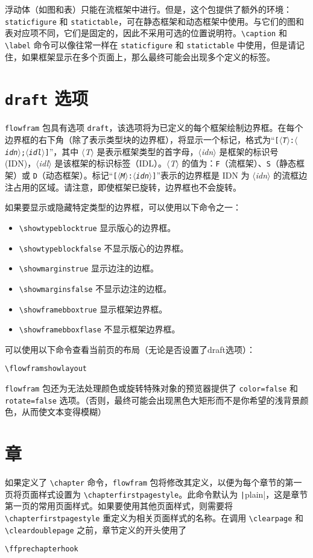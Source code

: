 \documentclass[a4paper]{book}%
\newcommand{\sty}[1]{\texttt{#1}}
\newcommand{\meta}[1]{\textnormal{\ensuremath{\langle}\makebox[0pt][l]{}\emph{#1}\makebox[0pt][l]{}\ensuremath{\rangle}}}
\newcommand{\cmd}[1]{\texttt{#1}}
\begin{document}
浮动体（如图和表）只能在流框架中进行。但是，这个包提供了额外的环境：\cmd{staticfigure} 和 \cmd{statictable}，可在静态框架和动态框架中使用。与它们的图和表对应项不同，它们是固定的，因此不采用可选的位置说明符。\verb|\caption| 和 \verb|\label| 命令可以像往常一样在 \cmd{staticfigure} 和 \cmd{statictable} 中使用，但是请记住，如果框架显示在多个页面上，那么最终可能会出现多个定义的标签。
\section{\cmd{draft} 选项}\label{sec-1-3}%
\sty{flowfram} 包具有选项 \cmd{draft}，该选项将为已定义的每个框架绘制边界框。在每个边界框的右下角（除了表示类型块的边界框），将显示一个标记，格式为“\cmd{[\meta{T}:\meta{idn};\meta{idl}]}”，其中 \meta{T} 是表示框架类型的首字母，\meta{idn} 是框架的标识号(IDN)，\meta{idl} 是该框架的标识标签（IDL）。\meta{T} 的值为：\cmd{F}（流框架）、\cmd{S}（静态框架）或 \cmd{D}（动态框架）。标记“\cmd{[\meta{M}:\meta{idn}]}”表示的边界框是 IDN 为 \meta{idn} 的流框边注占用的区域。请注意，即使框架已旋转，边界框也不会旋转。

如果要显示或隐藏特定类型的边界框，可以使用以下命令之一：
\begin{itemize}
    \item \verb|\showtypeblocktrue| 显示版心的边界框。
    \item \verb|\showtypeblockfalse| 不显示版心的边界框。
    \item \verb|\showmarginstrue| 显示边注的边框。
    \item \verb|\showmarginsfalse| 不显示边注的边框。
    \item \verb|\showframebboxtrue| 显示框架边界框。
    \item \verb|\showframebboxflase| 不显示框架边界框。
\end{itemize}

可以使用以下命令查看当前页的布局（无论是否设置了draft选项）：
\begin{mdframed}
\verb|\flowframshowlayout|
\end{mdframed}

\sty{flowfram} 包还为无法处理颜色或旋转特殊对象的预览器提供了 \cmd{color=false} 和 \cmd{rotate=false} 选项。（否则，最终可能会出现黑色大矩形而不是你希望的浅背景颜色，从而使文本变得模糊）
\section{章}%
如果定义了 \verb|\chapter| 命令，\sty{flowfram} 包将修改其定义，以便为每个章节的第一页将页面样式设置为 \verb|\chapterfirstpagestyle|。此命令默认为 \cmd|plain|，这是章节第一页的常用页面样式。如果要使用其他页面样式，则需要将 \verb|\chapterfirstpagestyle| 重定义为相关页面样式的名称。在调用 \verb|\clearpage| 和 \verb|\cleardoublepage| 之前，章节定义的开头使用了
\begin{mdframed}
\verb|\ffprechapterhook|
\end{mdframed}
\end{document}
